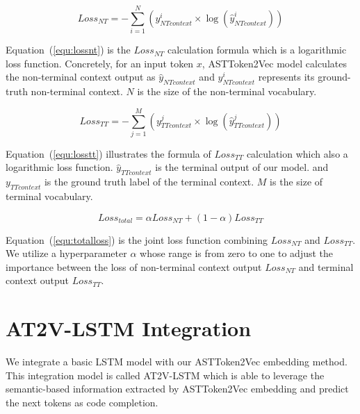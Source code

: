 \documentclass[E]{compsoft}
\begin{document}
\begin{equation}
\mathit{Loss}_{\mathit{NT}} = -\sum_{i=1}^{N}(y_{\mathit{NTcontext}}^{i} \times \log(\hat{y}_{\mathit{NTcontext}}^{i}))\label{equ:lossnt}
\end{equation}

Equation~(\ref{equ:lossnt}) is the $\mathit{Loss}_{\mathit{NT}}$ calculation formula which is a logarithmic loss function. 
Concretely, for an input token $x$, ASTToken2Vec model calculates the non-terminal context output as $\hat{y}_{\mathit{NTcontext}}$ and $y_{\mathit{NTcontext}}^{i}$ represents its ground-truth non-terminal context.
$N$ is the size of the non-terminal vocabulary. 


\begin{equation}
\mathit{Loss}_{\mathit{TT}} = -\sum_{j=1}^{M} (y_{\mathit{TTcontext}}^{j} \times \log(\hat{y}_{\mathit{TTcontext}}^{j}))\label{equ:losstt}
\end{equation}

Equation~(\ref{equ:losstt}) illustrates the formula of $\mathit{Loss}_{\mathit{TT}}$ calculation which also a logarithmic loss function. 
$\hat{y}_{\mathit{TTcontext}}$ is the terminal output of our model. and $y_{\mathit{TTcontext}}$ is the ground truth label of the terminal context.
$M$ is the size of terminal vocabulary.

\begin{equation}
\mathit{Loss}_{\mathit{total}} = \alpha  \mathit{Loss}_{\mathit{NT}} + (1-\alpha)  \mathit{Loss}_{\mathit{TT}}\label{equ:totalloss}
\end{equation}

Equation~(\ref{equ:totalloss}) is the joint loss function combining $\mathit{Loss}_{\mathit{NT}}$ and $\mathit{Loss}_{\mathit{TT}}$. 
We utilize a hyperparameter $\alpha$ whose range is from zero to one to adjust the importance between the loss of non-terminal context output $\mathit{Loss}_{\mathit{NT}}$ and terminal context output $\mathit{Loss}_{\mathit{TT}}$.




\section{AT2V-LSTM Integration}
\label{section:n2v-lstm-integration}
We integrate a basic LSTM model with our ASTToken2Vec embedding method. This integration model is called AT2V-LSTM which is able to leverage the semantic-based information extracted by ASTToken2Vec embedding and predict the next tokens as code completion.
\end{document}
